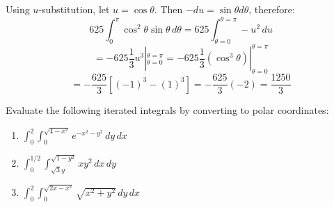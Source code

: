 Using $u$-substitution, let $u = \cos{\theta}$. Then $-du = \sin{\theta} d
\theta$, therefore:
$$625 \int_0^{\pi} \cos^2{\theta}\sin{\theta}\,d\theta = 625 \int_{\theta = 0}^
{\theta = \pi} -u^2\,du$$
$$= -625 \frac{1}{3}u^3|_{\theta = 0}^{\theta = \pi} = -625 \frac{1}{3} \left( 
\cos^3{\theta} \right)|_{\theta = 0}^{\theta = \pi}$$
$$= -\frac{625}{3} \left[ (-1)^3 - (1)^3 \right] = -\frac{625}{3} \left(-2 
\right) = \frac{1250}{3}$$

\begin{Exercise}[title = {Changing to Polar Coordinates}, label = polarmulti3]
Evaluate the following iterated integrals by converting to polar coordinates:
\begin{enumerate}
    \item $\int_0^2 \int_0^{\sqrt{4 - x^2}} e^{-x^2 - y^2}\,dy\,dx$
    \item $\int_0^{1/2} \int_{\sqrt{3}y}^{\sqrt{1 - y^2}} xy^2\,dx\,dy$
    \item $\int_0^2 \int_0^{\sqrt{2x - x^2}} \sqrt{x^2 + y^2}\,dy\,dx$
\end{enumerate}
\vspace{130mm}
\end{Exercise}

